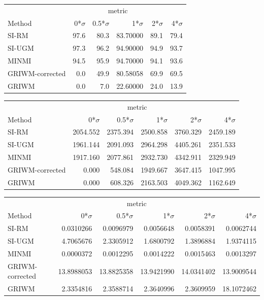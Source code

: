 \documentclass[
]{article}
\begin{document}
\begin{tabular}{lrrrrr}
\toprule
\multicolumn{1}{c}{ } & \multicolumn{4}{c}{metric} \\
\cmidrule(l{3pt}r{3pt}){2-5}
Method & 0*$\sigma$ & 0.5*$\sigma$ & 1*$\sigma$ & 2*$\sigma$ & 4*$\sigma$\\
\midrule
SI-RM & 97.6 & 80.3 & 83.70000 & 89.1 & 79.4\\
SI-UGM & 97.3 & 96.2 & 94.90000 & 94.9 & 93.7\\
MINMI & 94.5 & 95.9 & 94.70000 & 94.1 & 93.6\\
GRIWM-corrected & 0.0 & 49.9 & 80.58058 & 69.9 & 69.5\\
GRIWM & 0.0 & 7.0 & 22.60000 & 24.0 & 13.9\\
\bottomrule
\end{tabular}

\begin{tabular}{lrrrrr}
\toprule
\multicolumn{1}{c}{ } & \multicolumn{4}{c}{metric} \\
\cmidrule(l{3pt}r{3pt}){2-5}
Method & 0*$\sigma$ & 0.5*$\sigma$ & 1*$\sigma$ & 2*$\sigma$ & 4*$\sigma$\\
\midrule
SI-RM & 2054.552 & 2375.394 & 2500.858 & 3760.329 & 2459.189\\
SI-UGM & 1961.144 & 2091.093 & 2964.298 & 4405.261 & 2351.533\\
MINMI & 1917.160 & 2077.861 & 2932.730 & 4342.911 & 2329.949\\
GRIWM-corrected & 0.000 & 548.084 & 1949.667 & 3647.415 & 1047.995\\
GRIWM & 0.000 & 608.326 & 2163.503 & 4049.362 & 1162.649\\
\bottomrule
\end{tabular}

\begin{tabular}{lrrrrr}
\toprule
\multicolumn{1}{c}{ } & \multicolumn{4}{c}{metric} \\
\cmidrule(l{3pt}r{3pt}){2-5}
Method & 0*$\sigma$ & 0.5*$\sigma$ & 1*$\sigma$ & 2*$\sigma$ & 4*$\sigma$\\
\midrule
SI-RM & 0.0310266 & 0.0096979 & 0.0056648 & 0.0058391 & 0.0062744\\
SI-UGM & 4.7065676 & 2.3305912 & 1.6800792 & 1.3896884 & 1.9374115\\
MINMI & 0.0000372 & 0.0012295 & 0.0014222 & 0.0015463 & 0.0013297\\
GRIWM-corrected & 13.8988053 & 13.8825358 & 13.9421990 & 14.0341402 & 13.9009544\\
GRIWM & 2.3354816 & 2.3588714 & 2.3640996 & 2.3609959 & 18.1072462\\
\bottomrule
\end{tabular}
\end{document}
